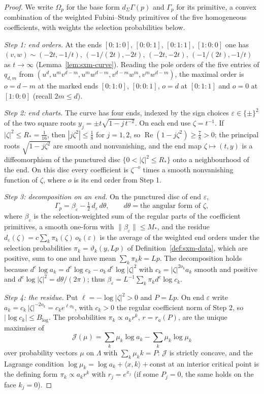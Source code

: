 \begin{proof}
We write $\Omega_p$ for the base form $d_\Sigma\Gamma(p)$ and $\Gamma_p$ for its primitive, a convex combination of
the weighted Fubini--Study primitives of the five homogeneous coefficients, with weights the selection
probabilities below.

\emph{Step 1: end orders.} At the ends $[0{:}1{:}0]$, $[0{:}0{:}1]$, $[0{:}1{:}1]$, $[1{:}0{:}0]$ one has
$(v,w)\sim(-2t,-1/t)$, $(-1/(2t),-2t)$, $(-2t,-2t)$, $(-1/(2t),-1/t)$ as $t\to\infty$ (Lemma~\ref{lem:sxm-curve}). Reading the
pole orders of the five entries of $q_{d,m}$ from $(u^d,u^mv^{d-m},u^mw^{d-m},v^{d-m}w^m,v^mw^{d-m})$,
the maximal order is $o=d-m$ at the marked ends $[0{:}1{:}0]$, $[0{:}0{:}1]$, $o=d$ at $[0{:}1{:}1]$ and $o=0$ at
$[1{:}0{:}0]$ (recall $2m\le d$).

\emph{Step 2: end charts.} The curve has four ends, indexed by the sign choices $\varepsilon\in\{\pm\}^2$ of the two
square roots $y_j=\pm t\sqrt{1-j\,t^{-2}}$. On each end use $\zeta=t^{-1}$. If $|\zeta|^2\le R_*=\frac1{16}$, then
$|j\zeta^2|\le\frac18$ for $j=1,2$, so $\operatorname{Re}(1-j\zeta^2)\ge\frac78>0$; the principal roots
$\sqrt{1-j\zeta^2}$ are smooth and nonvanishing, and the end map $\zeta\mapsto(t,y)$ is a diffeomorphism of the
punctured disc $\{0<|\zeta|^2\le R_*\}$ onto a neighbourhood of the end. On this disc every coefficient is
$\zeta^{-o}$ times a smooth nonvanishing function of $\zeta$, where $o$ is its end order from Step 1.

\emph{Step 3: decomposition on an end.} On the punctured disc of end $\varepsilon$,
\[
 \Gamma_p=\beta_{\varepsilon}-\tfrac12\,d_{\varepsilon}\,d\theta,\qquad d\theta=\text{the angular form of }\zeta,
\]
where $\beta_\varepsilon$ is the selection-weighted sum of the regular parts of the coefficient primitives, a smooth
one-form with $\|\beta_\varepsilon\|\le M_*$, and the residue $d_\varepsilon(\zeta)=c\sum_k\pi_k(\zeta)\,o_k(\varepsilon)$ is the
average of the weighted end orders under the selection probabilities $\pi_k=\vartheta_k(y,Lp)$ of Definition~\ref{def:sxm-data},
which are positive, sum to one and have mean $\sum_k\pi_kk=Lp$. The decomposition holds because $d^c\log a_k=d^c\log c_k-o_k\,d^c\log|\zeta|^2$ with
$c_k=|\zeta|^{2o_k}a_k$ smooth and positive and $d^c\log|\zeta|^2=d\theta/(2\pi)$; thus
$\beta_\varepsilon=L^{-1}\sum_k\pi_kd^c\log c_k$.

\emph{Step 4: the residue.} Put $\ell=-\log|\zeta|^2>0$ and $P=Lp$. On end $\varepsilon$ write
$a_k=c_k\,|\zeta|^{-2o_k}=c_ke^{\ell o_k}$, with $c_k>0$ the regular coefficient norm of Step 2, so $|\log c_k|\le B_{\log}$.
The probabilities $\pi_k\propto a_kr^k$, $r=r_a(P)$, are the unique maximiser of
\[
 \mathcal J(\mu)=\sum_k\mu_k\log a_k-\sum_k\mu_k\log\mu_k
\]
over probability vectors $\mu$ on $\Lambda$ with $\sum_k\mu_kk=P$: $\mathcal J$ is strictly concave, and the Lagrange condition
$\log\mu_k=\log a_k+\langle x,k\rangle+\text{const}$ at an interior critical point is the defining form $\pi_k\propto a_kr^k$ with
$r_j=e^{x_j}$ (if some $P_j=0$, the same holds on the face $k_j=0$).


\end{proof}
